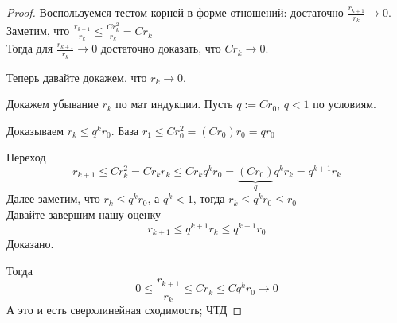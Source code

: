 

\begin{proof}
  Воспользуемся \hyperref[note:C0408924-F658-43DF-8794-0C9AA85E7580]{тестом корней} в форме отношений: достаточно $\frac{r_{k+1}}{r_k} \rightarrow 0$.
  Заметим, что $\frac{r_{k+1}}{r_k}\le \frac{C r^2_k}{r_k} = C r_k$ \\
  Тогда для $\frac{r_{k+1}}{r_k} \rightarrow 0$ достаточно доказать, что $Cr_{k} \rightarrow 0$.

  Теперь давайте докажем, что $r_k \rightarrow 0$.

  Докажем убывание $r_k$ по мат индукции.
  Пусть $q:=Cr_0$, $q < 1$ по условиям.

  Доказываем $r_k \le q^k r_0$. База $r_1 \le Cr_0^2 = (Cr_0) r_0 = q r_0$

  Переход
  \[
  r_{k+1} \le Cr_k^2 = C r_k r_k \le C r_k q^k r_0 = \underbrace{(C r_0)}_{q} q^k r_k = q^{k+1} r_k
  \]
  Далее заметим, что $r_k \le q^k r_0$, а $q^k < 1$, тогда $r_k \le q^k r_0\le r_0$ \\
  Давайте завершим нашу оценку
  \[
  r_{k+1} \le q^{k+1}r_k \le q^{k+1}r_0
  \]
  Доказано.

  Тогда
  \[
  0 \le \frac{r_{k+1}}{r_k}\le Cr_k \le Cq^kr_0 \rightarrow 0
  \]
  А это и есть сверхлинейная сходимость;
  ЧТД
\end{proof}

